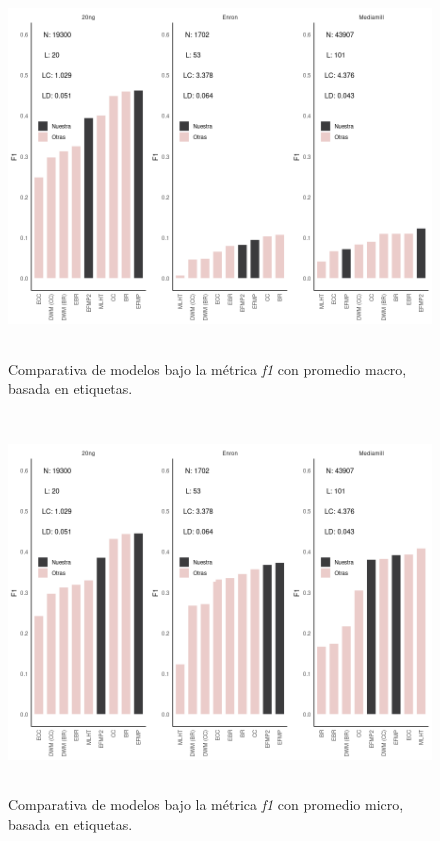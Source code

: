 \begin{figure}
	\includegraphics[width=\linewidth,height=10cm]{figures/experiments/classification/f1_macro.png}
	\caption{Comparativa de modelos bajo la métrica \textit{f1} con promedio
		macro, basada en etiquetas.}
	\label{fig:comparativa_f1_macro}
\end{figure}

\begin{figure}
	\includegraphics[width=\linewidth,height=10cm]{figures/experiments/classification/f1_micro.png}
	\caption{Comparativa de modelos bajo la métrica \textit{f1} con promedio
		micro, basada en etiquetas.}
	\label{fig:comparativa_f1_micro}
\end{figure}

